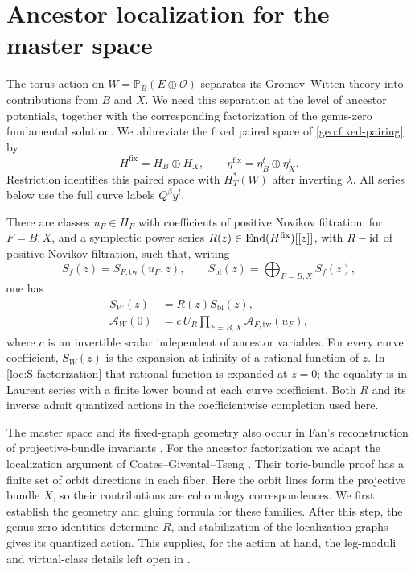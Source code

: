 \section{Ancestor localization for the master space}\label{loc:section}

The torus action on $W=\mathbb P_B(E\oplus\mathcal O)$ separates its
Gromov--Witten theory into contributions from $B$ and $X$.
We need this separation at the level of ancestor potentials, together with
the corresponding factorization of the genus-zero fundamental solution.
We abbreviate the fixed paired space of \eqref{geo:fixed-pairing} by
\[
  H^{\mathrm{fix}}=H_B\oplus H_X,
  \qquad \eta^{\mathrm{fix}}=\eta_B^t\oplus\eta_X^t.
\]
Restriction identifies this paired space with $H_T^*(W)$ after inverting
$\lambda$. All series below use the full curve labels $Q^\beta y^l$.

\begin{proposition}\label{loc:factorization}
There are classes $u_F\in H_F$ with coefficients of positive Novikov
filtration, for $F=B,X$, and a symplectic power series
$R(z)\in\operatorname{End}(H^{\mathrm{fix}})[[z]]$, with $R-\operatorname{id}$ of positive Novikov
filtration, such that, writing
\[
 S_f(z)=S_{F,\mathrm{tw}}(u_F,z),\qquad
 S_{\mathrm{bl}}(z)=\bigoplus_{F=B,X}S_f(z),
\]
one has
\begin{align}
 S_W(z)&=R(z)S_{\mathrm{bl}}(z),\label{loc:S-factorization}\\
 \mathcal A_W(0)&=c\,U_R
       \prod_{F=B,X}\mathcal A_{F,\mathrm{tw}}(u_F),
       \label{loc:A-factorization}
\end{align}
where $c$ is an invertible scalar independent of ancestor variables.
For every curve coefficient, $S_W(z)$ is the expansion at infinity of a
rational function of $z$. In \eqref{loc:S-factorization} that rational
function is expanded at $z=0$; the equality is in Laurent series with a
finite lower bound at each curve coefficient. Both $R$ and its inverse
admit quantized actions in the coefficientwise completion used here.
\end{proposition}

The master space and its fixed-graph geometry also occur in
Fan's reconstruction of projective-bundle invariants
\cite[\S\S3--4]{Fan}. For the ancestor factorization we adapt the
localization argument of Coates--Givental--Tseng \cite[\S3]{CGT}.
Their toric-bundle proof has a
finite set of orbit directions in each fiber. Here the orbit lines form
the projective bundle $X$, so their contributions are cohomology
correspondences. We first establish the geometry and gluing formula for
these families. After this step, the genus-zero identities determine
$R$, and stabilization of the localization graphs gives its quantized
action. This supplies, for the action at hand, the leg-moduli and virtual-class details
left open in \cite[Remark~3.7]{CGT}.

